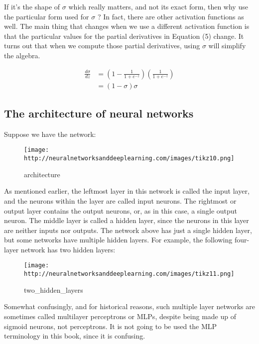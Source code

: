 \documentclass[]{article}
\begin{document}
If it's the shape of $ \sigma $ which really matters, and not its
exact form, then why use the particular form used for $ \sigma $ ? In
fact, there are other activation functions as well. The main thing that
changes when we use a different activation function is that the
particular values for the partial derivatives in Equation (5) change. It
turns out that when we compute those partial derivatives, using $
\sigma $ will simplify the algebra.

\begin{equation}
    \begin{split}
        \frac{d\sigma}{dz} &= \left({1 - \frac{1}{1 + e ^ {-z}}}\right)
        \left(\frac{1}{1 + e ^ {-z}}\right)\\
        &=(1 - \sigma)\sigma
    \end{split}
\end{equation}

\subsection{The architecture of neural
networks}\label{the-architecture-of-neural-networks}

Suppose we have the network:

\begin{figure}[htbp]
\centering
\texttt{[image: http://neuralnetworksanddeeplearning.com/images/tikz10.png]}
\caption{architecture}
\end{figure}

As mentioned earlier, the leftmost layer in this network is called the
input layer, and the neurons within the layer are called input neurons.
The rightmost or output layer contains the output neurons, or, as in
this case, a single output neuron. The middle layer is called a hidden
layer, since the neurons in this layer are neither inputs nor outputs.
The network above has just a single hidden layer, but some networks have
multiple hidden layers. For example, the following four-layer network
has two hidden layers:

\begin{figure}[htbp]
\centering
\texttt{[image: http://neuralnetworksanddeeplearning.com/images/tikz11.png]}
\caption{two\_hidden\_layers}
\end{figure}

Somewhat confusingly, and for historical reasons, such multiple layer
networks are sometimes called multilayer perceptrons or MLPs, despite
being made up of sigmoid neurons, not perceptrons. It is not going to be
used the MLP terminology in this book, since it is confusing.
\end{document}
